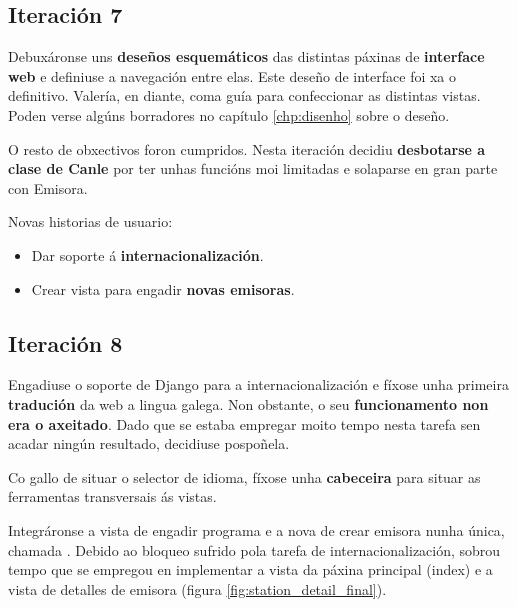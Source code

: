 \subsection{Iteración 7}

Debuxáronse uns \textbf{deseños esquemáticos} das distintas páxinas de \textbf{interface web} e definiuse a navegación entre elas. Este deseño de interface foi xa o definitivo. Valería, en diante, coma guía para confeccionar as distintas vistas. Poden verse algúns borradores no capítulo \ref{chp:disenho} sobre o deseño.

O resto de obxectivos foron cumpridos. Nesta iteración decidiu \textbf{desbotarse a clase de Canle} por ter unhas funcións moi limitadas e solaparse en gran parte con Emisora.

Novas historias de usuario:
\begin{itemize}
	\item Dar soporte á \textbf{internacionalización}.
	\item Crear vista para engadir \textbf{novas emisoras}.
\end{itemize}


\subsection{Iteración 8}

Engadiuse o soporte de Django para a internacionalización e fíxose unha primeira \textbf{tradución} da web a lingua galega. Non obstante, o seu \textbf{funcionamento non era o axeitado}. Dado que se estaba empregar moito tempo nesta tarefa sen acadar ningún resultado, decidiuse pospoñela.

Co gallo de situar o selector de idioma, fíxose unha \textbf{cabeceira} para situar as ferramentas transversais ás vistas.

Integráronse a vista de engadir programa e a nova de crear emisora nunha única, chamada . Debido ao bloqueo sufrido pola tarefa de internacionalización, sobrou tempo que se empregou en implementar a vista da páxina principal (index) e a vista de detalles de emisora (figura \ref{fig:station_detail_final}).

